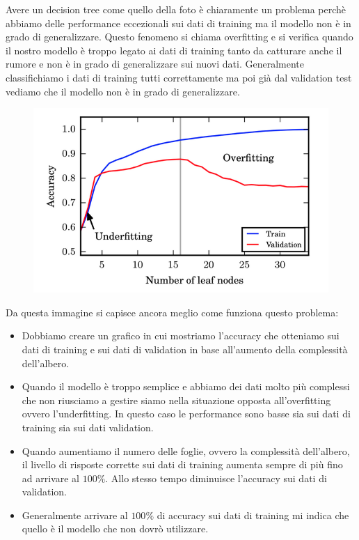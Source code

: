 \documentclass[14pt]{extreport}
\begin{document}
Avere un decision tree come quello della foto è chiaramente un problema perchè abbiamo delle performance eccezionali sui dati di training ma il
modello non è in grado di generalizzare. Questo fenomeno si chiama overfitting e si verifica quando il nostro modello è troppo legato ai dati di
training tanto da catturare anche il rumore e non è in grado di generalizzare sui nuovi dati. Generalmente classifichiamo i dati di training tutti
correttamente ma poi già dal validation test vediamo che il modello non è in grado di generalizzare.



\begin{figure}[H]
	\centering
	\includegraphics[width=0.7\linewidth]{592.jpeg}
\end{figure}




Da questa immagine si capisce ancora meglio come funziona questo problema:
\begin{itemize}
	\item  Dobbiamo creare un grafico in cui mostriamo l’accuracy che otteniamo sui dati di training e sui dati di validation in base all’aumento
	della complessità dell’albero.
	\item Quando il modello è troppo semplice e abbiamo dei dati molto più complessi che non riusciamo a gestire siamo nella situazione opposta
	all’overfitting ovvero l’underfitting. In questo caso le performance sono basse sia sui dati di training sia sui dati validation.
	\item Quando aumentiamo il numero delle foglie, ovvero la complessità dell’albero, il livello di risposte corrette sui dati di training aumenta
	sempre di più fino ad arrivare al $100\%$. Allo stesso tempo diminuisce l’accuracy sui dati di validation.
	\item Generalmente arrivare al $100\%$ di accuracy sui dati di training mi indica che quello è il modello che non dovrò utilizzare.
\end{itemize}
\end{document}
